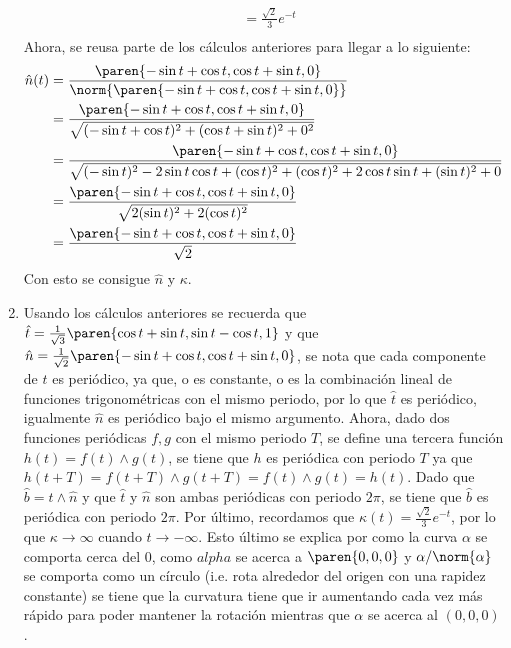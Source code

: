 \documentclass{homework}
\begin{document}
\begin{sol}
\begin{enumerate}
\begin{align*}
            &=\frac{\sqrt{2}}3e^{-t}\\
        \end{align*}
        Ahora, se reusa parte de los cálculos anteriores para llegar a lo siguiente:
        \begin{align*}
            \hat{n}(t)&=\frac{\paren{-\sin t+\cos t,\cos t+\sin t, 0}}{\norm{\paren{-\sin t+\cos t,\cos t+\sin t, 0}}}\\
            &=\frac{\paren{-\sin t+\cos t,\cos t+\sin t, 0}}{\sqrt{(-\sin t+\cos t)^2+(\cos t+\sin t)^2+ 0^2}}\\
            &=\frac{\paren{-\sin t+\cos t,\cos t+\sin t, 0}}{\sqrt{(-\sin t)^2-2\sin t\cos t+(\cos t)^2+(\cos t)^2+2\cos t\sin t+(\sin t)^2+ 0}}\\
            &=\frac{\paren{-\sin t+\cos t,\cos t+\sin t, 0}}{\sqrt{2(\sin t)^2+2(\cos t)^2}}\\
            &=\frac{\paren{-\sin t+\cos t,\cos t+\sin t, 0}}{\sqrt{2}}\\
        \end{align*}
        Con esto se consigue \(\hat{n}\) y \(\kappa\).
        \item Usando los cálculos anteriores se recuerda que \(\hat{t}=\frac1{\sqrt{3}}\paren{\cos t+\sin t, \sin t-\cos t, 1}\) y que \(\hat{n}=\frac1{\sqrt{2}}\paren{-\sin t+\cos t,\cos t+\sin t, 0}\), se nota que cada componente de \(\hat{t}\) es periódico, ya que, o es constante, o es la combinación lineal de funciones trigonométricas con el mismo periodo, por lo que \(\hat{t}\) es periódico, igualmente \(\hat{n}\) es periódico bajo el mismo argumento. Ahora, dado dos funciones periódicas  \(f,g\) con el mismo periodo \(T\), se define una tercera función \(h(t)=f(t)\wedge g(t)\), se tiene que \(h\) es periódica con periodo \(T\) ya que \(h(t+T)=f(t+T)\wedge g(t+T)=f(t)\wedge g(t)=h(t)\). Dado que \(\hat{b}=\hat{t}\wedge \hat{n}\) y que \(\hat{t}\) y \(\hat{n}\) son ambas periódicas con periodo \(2\pi\), se tiene que \(\hat{b}\) es periódica con periodo \(2\pi\). Por último, recordamos que \(\kappa(t)=\frac{\sqrt{2}}3e^{-t}\), por lo que \(\kappa\rightarrow\infty\) cuando \(t\rightarrow-\infty\). Esto último se explica por como la curva \(\alpha\) se comporta cerca del \(0\), como \(alpha\) se acerca a \(\paren{0,0,0}\) y \(\alpha/\norm{\alpha}\) se comporta como un círculo (i.e. rota alrededor del origen con una rapidez constante) se tiene que la curvatura tiene que ir aumentando cada vez más rápido para poder mantener la rotación mientras que \(\alpha\) se acerca al \((0,0,0)\).
    \end{enumerate}
\end{sol}
\end{document}

